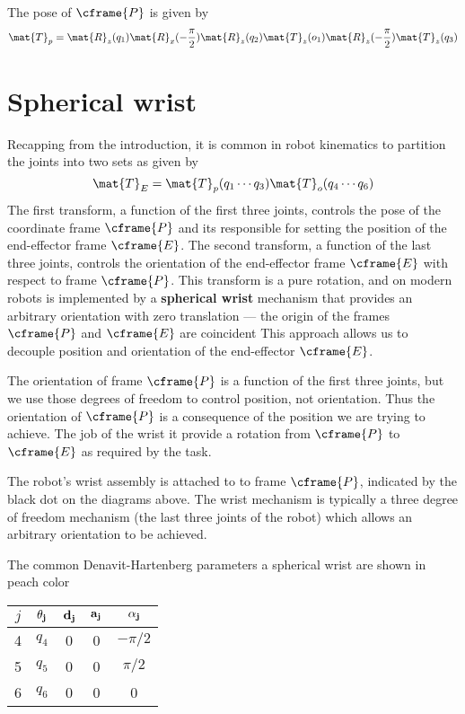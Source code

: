 \documentclass[11pt]{article}
\numberwithin{equation}{section}
\begin{document}
The pose of $\cframe{P}$ is given by
\[
\mat{T}_p = \mat{R}_z(q_1) \mat{R}_x(-\frac{\pi}{2}) \mat{R}_z(q_2)  \mat{T}_z(o_1)  \mat{R}_z(-\frac{\pi}{2}) \mat{T}_z(q_3)
\]

\section{Spherical wrist}\label{sec:wrist}
Recapping from the introduction, it is common in robot kinematics  to partition the joints into two sets as given by 
\[
\mat{T}_E = \mat{T}_p(q_1 \cdots q_3) \mat{T}_o(q_4 \cdots q_6) 
\]
The first transform, a function of the  first three joints, controls the pose of the coordinate frame $\cframe{P}$ and its responsible for setting the position
of the end-effector frame $\cframe{E}$.
The second transform, a function of the last three joints, controls the orientation of the end-effector frame $\cframe{E}$ with respect to frame
$\cframe{P}$.  This transform is a pure rotation, and on modern robots is implemented by  a \textbf{spherical wrist} mechanism that provides an arbitrary orientation with zero translation --- the origin of the frames
$\cframe{P}$ and $\cframe{E}$ are coincident 
This  approach allows us to decouple position and orientation of the end-effector $\cframe{E}$. 

The orientation of frame $\cframe{P}$ is a function of the first three joints, but we use those degrees of freedom to control position, not orientation.  Thus the orientation of $\cframe{P}$ is a consequence of the position we are trying to achieve.  The job of the wrist it provide a rotation from
$\cframe{P}$ to $\cframe{E}$ as required by the task.  

The robot's wrist assembly is attached to to frame $\cframe{P}$, indicated by the black dot on the diagrams above.
The wrist mechanism is typically a three degree
of freedom mechanism (the last three joints of the robot) which allows an arbitrary orientation to be achieved.

The common Denavit-Hartenberg parameters a spherical wrist are shown in peach color
\begin{center}
\begin{tabular}{|c|c|c|c|c|} \hline
$j$ & $\bf \theta_j$ & $\bf d_j$ & $\bf a_j$ & $\bf \alpha_j$ \\ \hline
\rowcolor{Peach}4 & $q_4$ & 0 & 0 & $-\pi/2$ \\
\rowcolor{Peach}5 &  $q_5$ & 0 & 0 & $\pi/2$ \\
\cellcolor{Peach} 6 & \cellcolor{Peach} $q_6$ & 0 &0  & 0 \\ \hline
\end{tabular}
\end{center}
\end{document}
